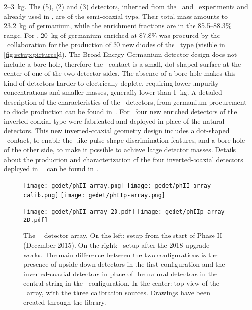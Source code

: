 2--3~kg. The \ANG{} (5), \RG{} (2) and \GTF{} (3) detectors, inherited from the \hdm\ and
\igex\ experiments and already used in \phaseone, are of the semi-coaxial type. Their
total mass amounts to 23.2~kg of germanium, while the enrichment fractions are in the
85.5--88.3\% range. For \phasetwo, 20~kg of germanium enriched at 87.8\% was procured by
the \gerda\ collaboration for the production of 30 new diodes of the \bege\ type (visible
in \cref{fig:setup:pictures}d). The Broad Energy Germanium detector design does not
include a bore-hole, therefore the \pplus\ contact is a small, dot-shaped surface at the
center of one of the two detector sides. The absence of a bore-hole makes this kind of
detectors harder to electrically deplete, requiring lower impurity concentrations and
smaller masses, generally lower than 1~kg. A detailed description of the characteristics
of the \bege\ detectors, from germanium procurement to diode production can be found
in~\cite{Agostini2015e, Agostini2018a, Agostini2019}. For \phasetwop\ four new enriched
\IC{} detectors of the inverted-coaxial type were fabricated and deployed in place of the
natural \GTF{} detectors. This new inverted-coaxial geometry design includes a dot-shaped
\pplus\ contact, to enable the \bege-like pulse-shape discrimination features, and a
bore-hole of the other side, to make it possible to achieve large detector masses. Details
about the production and characterization of the  four inverted-coaxial detectors deployed
in \gerda\ \phasetwop\ can be found in~\cite{Miloradovic2020, Agostini2021b}.

\begin{figure}
  \centering
  \texttt{[image: gedet/phII-array.png]}%
  \hspace{0.5cm}%
  \texttt{[image: gedet/phII-array-calib.png]}%
  \hspace{0.5cm}%
  \texttt{[image: gedet/phIIp-array.png]}
  \vspace{1cm}

  \texttt{[image: gedet/phII-array-2D.pdf]}%
  \hspace{0.04\textwidth}%
  \texttt{[image: gedet/phIIp-array-2D.pdf]}
  \caption[placeholder]{%
    The \gerda\ \phasetwo\ detector array. On the left: setup from the start of Phase II
    (December 2015). On the right: \phasetwop\ setup after the 2018 upgrade works. The
    main difference between the two configurations is the presence of upside-down detectors
    in the first configuration and the inverted-coaxial detectors in place of the natural
    detectors in the central string in the \phasetwop\ configuration. In the center: top
    view of the \phasetwo\ array, with the three calibration sources. Drawings have been
    created through the  library\footnotemark{}. 
  }\label{fig:setup:array}
\end{figure}

